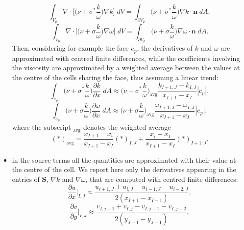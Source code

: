 \begin{itemize}
\begin{equation}
		\int_{V_p} \nabla \cdot \bigg[\bigg(\nu + 
		\sigma^*\frac{k}{\omega}\bigg) \nabla k\bigg] \; dV = \int_{\partial 
		V_p} \bigg(\nu + \sigma^*\frac{k}{\omega}\bigg) \nabla k \cdot 
		\mathbf{n} \; dA,
	\end{equation}
	\begin{equation}
	\int_{V_p} \nabla \cdot \bigg[\bigg(\nu + \sigma\frac{k}{\omega}\bigg) 
	\nabla \omega\bigg] \; dV = \int_{\partial V_p} \bigg(\nu + \sigma 
	\frac{k}{\omega}\bigg) \nabla \omega \cdot \mathbf{n} \; dA.
	\end{equation}
	Then, considering for example the face $e_p$, the derivatives of $k$ and 
	$\omega$ are approximated with centred finite differences, while the 
	coefficients involving the viscosity are approximated by a weighted average 
	between the values at the centre of the cells sharing the face, thus 
	assuming a linear trend:
	\begin{equation}
	\int_{e_p} \bigg(\nu + \sigma^*\frac{k}{\omega}\bigg) \frac{\partial 
	k}{\partial x} \; dA \approx \bigg(\nu + \sigma^* 
	\frac{k}{\omega}\bigg)_\text{avg} \frac{k_{I+1,J}-k_{I,J}}{x_{I+1}-x_I} 
	|e_p|,
	\end{equation}
	\begin{equation}
	\int_{e_p} \bigg(\nu + \sigma\frac{k}{\omega}\bigg) \frac{\partial 
	\omega}{\partial x} \; dA \approx \bigg(\nu + \sigma 
	\frac{k}{\omega}\bigg)_\text{avg} 
	\frac{\omega_{I+1,J}-\omega_{I,J}}{x_{I+1} - x_I} |e_p|,
	\end{equation}
	where the subscript $_\text{avg}$ denotes the weighted average
	\begin{equation}
	(\ast)_\text{avg} = \frac{x_{I+1} - x_i}{x_{I+1} - x_I}(\ast)_{I,J} + 
	\frac{x_i-x_I}{x_{I+1} - x_I}(\ast)_{I+1,J}.
	\end{equation}
	\item in the source terms all the quantities are approximated with their 
	value at the centre of the cell. We report here only the derivatives 
	appearing in the entries of $\mathbf{S}$, $\nabla k$ and $\nabla \omega$, 
	that are computed with centred finite differences:
	\begin{equation}
		\frac{\partial u}{\partial x}\Big|_{I,J} \approx 
		\frac{u_{i+1,J}+u_{i,J}-u_{i-1,J}-u_{i-2,J}}{2(x_{I+1}-x_{I-1})},
	\end{equation}
	\begin{equation}
	\frac{\partial v}{\partial y} \Big|_{I,J} \approx
	\frac{v_{I,j+1}+v_{I,j}-v_{I,j-1}-v_{I,j-2}}{2(y_{J+1}-y_{J-1})},
	\end{equation}

\end{itemize}
